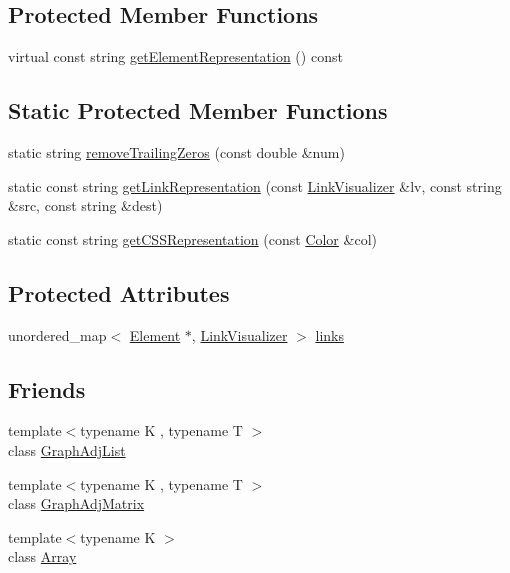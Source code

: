 \subsection*{Protected Member Functions}
\begin{DoxyCompactItemize}
\item 
virtual const string \hyperlink{classbridges_1_1_element_aac13ea6244099496172c8549e48a9f73}{get\+Element\+Representation} () const 
\end{DoxyCompactItemize}
\subsection*{Static Protected Member Functions}
\begin{DoxyCompactItemize}
\item 
static string \hyperlink{classbridges_1_1_element_a0b905a076a71771a20ee4fb0ec858cfa}{remove\+Trailing\+Zeros} (const double \&num)
\item 
static const string \hyperlink{classbridges_1_1_element_ac6fa7b04e28a1e9b8d8f2d395dd6e2c1}{get\+Link\+Representation} (const \hyperlink{classbridges_1_1_link_visualizer}{Link\+Visualizer} \&lv, const string \&src, const string \&dest)
\item 
static const string \hyperlink{classbridges_1_1_element_a513b3409e4b689a390b0dcd50cc2d643}{get\+C\+S\+S\+Representation} (const \hyperlink{classbridges_1_1_color}{Color} \&col)
\end{DoxyCompactItemize}
\subsection*{Protected Attributes}
\begin{DoxyCompactItemize}
\item 
unordered\+\_\+map$<$ \hyperlink{classbridges_1_1_element}{Element} $\ast$, \hyperlink{classbridges_1_1_link_visualizer}{Link\+Visualizer} $>$ \hyperlink{classbridges_1_1_element_a6fb53728edc378f26238543b26238496}{links}
\end{DoxyCompactItemize}
\subsection*{Friends}
\begin{DoxyCompactItemize}
\item 
{\footnotesize template$<$typename K , typename T $>$ }\\class \hyperlink{classbridges_1_1_element_a1ec5df26ff2381673c41d5a8d1f222e2}{Graph\+Adj\+List}
\item 
{\footnotesize template$<$typename K , typename T $>$ }\\class \hyperlink{classbridges_1_1_element_ae8ba4af32b14c8ac8a3f8f861e914444}{Graph\+Adj\+Matrix}
\item 
{\footnotesize template$<$typename K $>$ }\\class \hyperlink{classbridges_1_1_element_ab1a595168ea1870ce436dfd2d8e69b6d}{Array}
\end{DoxyCompactItemize}


